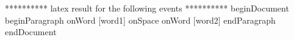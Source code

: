 ********** latex result for the following events **********
beginDocument
beginParagraph
onWord [word1]
onSpace
onWord [word2]
endParagraph
endDocument
